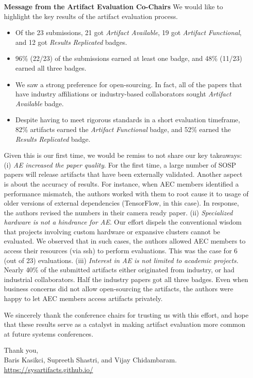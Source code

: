 \documentclass{letter}
\begin{document}
\begin{letter}{\large \bf {Message from the Artifact Evaluation Co-Chairs}}
We would like to highlight the key results of the artifact evaluation process.
\begin{itemize}
\setlength\itemsep{1mm}
\item Of the 23 submissions, 21 got \emph{Artifact Available}, 19 got \emph{Artifact Functional}, and 12 got \emph{Results Replicated} badges. 
\item 96\% (22/23) of the submissions earned at least one badge, and 48\% (11/23) earned all three badges.
\item We saw a strong preference for open-sourcing. In fact, all of the papers that have industry affiliations or industry-based collaborators sought \emph{Artifact Available} badge.
\item Despite having to meet rigorous standards in a short evaluation timeframe, 82\% artifacts earned the \emph{Artifact Functional} badge, and 52\% earned the \emph{Results Replicated} badge.
\end{itemize}
 
Given this is our first time, we would be remiss to not share our key takeaways: (i) \emph{AE increased the paper quality}. For the first time, a large number of SOSP papers will release artifacts that have been externally validated. Another aspect is about the accuracy of results. For instance, when AEC members identified a performance mismatch, the authors worked with them to root cause it to usage of older versions of external dependencies (TensorFlow, in this case). In response, the authors revised the numbers in their camera ready paper. (ii) \emph{Specialized hardware is not a hindrance for AE}. Our effort dispels the conventional wisdom that projects involving custom hardware or expansive clusters cannot be evaluated. We observed that in such cases, the authors allowed AEC members to access their resources (via ssh) to perform evaluations. This was the case for 6 (out of 23) evaluations. (iii) \emph{Interest in AE is not limited to academic projects.} Nearly 40\% of the submitted artifacts either originated from industry, or had industrial collaborators. Half the industry papers got all three badges. Even when business concerns did not allow open-sourcing the artifacts, the authors were happy to let AEC members access artifacts privately. 

We sincerely thank the conference chairs for trusting us with this effort, and hope that these results serve as a catalyst in making artifact evaluation more common at future systems conferences. 

Thank you,\\
Baris Kasikci, Supreeth Shastri, and Vijay Chidambaram.\\
\url{https://sysartifacts.github.io/}

\end{letter}
\end{document}
